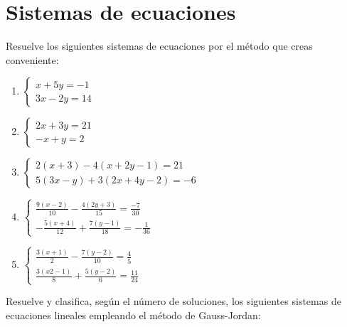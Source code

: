 \section{Sistemas de ecuaciones}

\Exercicio Resuelve los siguientes sistemas de ecuaciones por el método que creas conveniente:

\begin{enumerate}[topsep=0pt]
	\item $\begin{cases}
			x+5y = -1 \\
			3x-2y = 14
			\end{cases}$
	\item $\begin{cases}
			2x+3y = 21 \\
			-x + y = 2
			\end{cases}$
	\item $\begin{cases}
			2(x+3) - 4(x+2y-1) = 21 \\
			5(3x-y) + 3(2x+4y-2) = -6
		   \end{cases}$
	\item $\begin{cases}
			\frac{9(x-2)}{10} - \frac{4(2y + 3)}{15} = \frac{-7}{30} \\
			-\frac{5(x+4)}{12} + \frac{7(y-1)}{18} = -\frac{1}{36}
		   \end{cases} $
	\item $\begin{cases}
			\frac{3(x+1)}{2} - \frac{7(y-2)}{10} = \frac{4}{5} \\
			\frac{3(x2-1)}{8} + \frac{5(y-2)}{6} = \frac{11}{24}
		   \end{cases}$
\end{enumerate}


\Exercicio Resuelve y clasifica, según el número de soluciones, los siguientes sistemas de ecuaciones lineales empleando el método de Gauss-Jordan:


